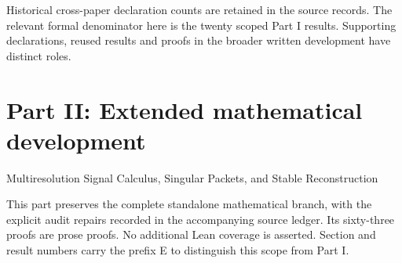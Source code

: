 \documentclass[11pt,letterpaper]{article}
\theoremstyle{plain}
\theoremstyle{plain}
\theoremstyle{plain}
\theoremstyle{definition}
\theoremstyle{definition}
\theoremstyle{definition}
\theoremstyle{definition}
\theoremstyle{remark}
\theoremstyle{remark}
\theoremstyle{remark}
\theoremstyle{remark}
\begin{document}
Historical cross-paper declaration counts are retained in the source records. The relevant formal denominator here is the twenty scoped Part I results. Supporting declarations, reused results and proofs in the broader written development have distinct roles.

\clearpage
\part*{Part II: Extended mathematical development}
\begin{center}\large Multiresolution Signal Calculus, Singular Packets, and Stable Reconstruction\end{center}
\noindent This part preserves the complete standalone mathematical branch, with the explicit audit repairs recorded in the accompanying source ledger. Its sixty-three proofs are prose proofs. No additional Lean coverage is asserted. Section and result numbers carry the prefix E to distinguish this scope from Part I.
\setcounter{section}{0}\setcounter{figure}{0}\setcounter{table}{0}
\renewcommand{\thesection}{E\arabic{section}}
\renewcommand{\theHsection}{extension.\arabic{section}}
\renewcommand{\thefigure}{E\arabic{figure}}
\renewcommand{\theHfigure}{extension.\arabic{figure}}
\renewcommand{\thetable}{E\arabic{table}}
\renewcommand{\theHtable}{extension.\arabic{table}}
\graphicspath{{extension_figures/}}

\begin{abstract}
Signals on a lattice admit exact coordinates indexed by the residue classes of every finite index sublattice. Convolution becomes a matrix of packet transfers, while filter banks and packet trees become exact changes of coordinates. We develop this structure on sequence spaces, prove quantitative stability for imperfect and perturbed banks, and give an exact dynamic recursion for adaptive packet trees. A singular signal is written as a smooth component plus step or truncated power packets that record jumps in the signal and its derivatives. Retaining the correct packets leaves only the smooth approximation error. Estimated packets are governed by exact formulas involving value error, region overlap, boundary displacement, and the norm of the smooth approximation operator. The main recovery result treats separated jumps sampled on a uniform grid. An explicit contrast gap gives exact recovery of every jump cell, grid scale location accuracy, amplitude control, and finite norm consistency. Probability bounds cover sub-Gaussian noise and repeated measurements. Haar coefficients, two shifted grids, and annihilating differences give complementary localization results. The final sections treat Gibbs oscillation, nonlinear residue interactions, numerical illustrations, and cyclic Cayley coordinates.
\end{abstract}
\end{document}
